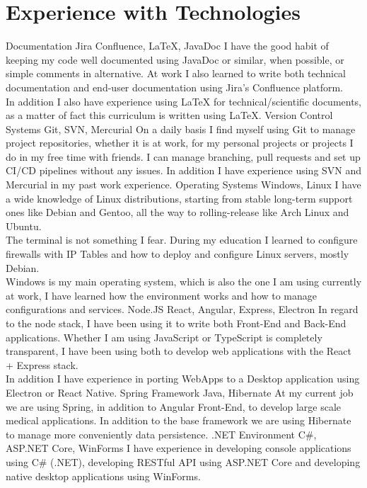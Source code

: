 \section*{Experience with Technologies}
\tech
  {Documentation}
  {Jira Confluence, LaTeX, JavaDoc}
  {I have the good habit of keeping my code well documented using JavaDoc or similar, when possible, or simple comments in alternative. At work I also learned to write both technical documentation and end-user documentation using Jira's Confluence platform.\\
  In addition I also have experience using LaTeX for technical/scientific documents, as a matter of fact this curriculum is written using \LaTeX .}
\tech
  {Version Control Systems}
  {Git, SVN, Mercurial}
  {On a daily basis I find myself using Git to manage project repositories, whether it is at work, for my personal projects or projects I do in my free time with friends. I can manage branching, pull requests and set up CI/CD pipelines without any issues. In addition I have experience using SVN and Mercurial in my past work experience.}
\tech
  {Operating Systems}
  {Windows, Linux}
  {I have a wide knowledge of Linux distributions, starting from stable long-term support ones like Debian and Gentoo, all the way to rolling-release like Arch Linux and Ubuntu.\\
  The terminal is not something I fear. During my education I learned to configure firewalls with IP Tables and how to deploy and configure Linux servers, mostly Debian.\\
  Windows is my main operating system, which is also the one I am using currently at work, I have learned how the environment works and how to manage configurations and services.}
\tech
  {Node.JS}
  {React, Angular, Express, Electron}
  {In regard to the node stack, I have been using it to write both Front-End and Back-End applications. Whether I am using JavaScript or TypeScript is completely transparent, I have been using both to develop web applications with the React + Express stack.\\
  In addition I have experience in porting WebApps to a Desktop application using Electron or React Native.}
\tech
  {Spring Framework}
  {Java, Hibernate}
  {At my current job we are using Spring, in addition to Angular Front-End, to develop large scale medical applications. In addition to the base framework we are using Hibernate to manage more conveniently data persistence.}
\tech
  {.NET Environment}
  {C\#, ASP.NET Core, WinForms}
  {I have experience in developing console applications using C\# (.NET), developing RESTful API using ASP.NET Core and developing native desktop applications using WinForms.}